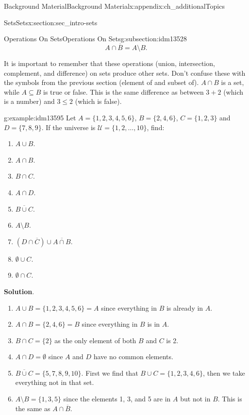 \documentclass[oneside,10pt,]{book}
\numberwithin{equation}{chapter}
\def\U{\mathcal U}
\begin{document}
\begin{appendixptx}{Background Material}{}{Background Material}{}{}{x:appendix:ch_additionalTopics}
\begin{sectionptx}{Sets}{}{Sets}{}{}{x:section:sec_intro-sets}
\begin{subsectionptx}{Operations On Sets}{}{Operations On Sets}{}{}{g:subsection:idm13528}
\begin{equation*}
A \cap \overline B = A \setminus B.
\end{equation*}
%
\par
It is important to remember that these operations (union, intersection, complement, and difference) on sets produce other sets. Don't confuse these with the symbols from the previous section (element of and subset of). \(A \cap B\) is a set, while \(A \subseteq B\) is true or false. This is the same difference as between \(3 + 2\) (which is a number) and \(3 \le 2\) (which is false).%
\begin{example}{}{g:example:idm13595}%
Let \(A = \{1, 2, 3, 4, 5, 6\}\), \(B = \{2, 4, 6\}\), \(C = \{1, 2, 3\}\) and \(D = \{7, 8, 9\}\). If the universe is \(\U = \{1, 2, \ldots, 10\}\), find:%
\begin{enumerate}
\item{}\(A \cup B\).%
\item{}\(A \cap B\).%
\item{}\(B \cap C\).%
\item{}\(A \cap D\).%
\item{}\(\overline{B \cup C}\).%
\item{}\(A \setminus B\).%
\item{}\((D \cap \overline C) \cup \overline{A \cap B}\).%
\item{}\(\emptyset \cup C\).%
\item{}\(\emptyset \cap C\).%
\end{enumerate}
%
\par\smallskip%
\noindent\textbf{Solution}.\hypertarget{g:solution:idm13622}{}\quad{}%
\begin{enumerate}
\item{}\(A \cup B = \{1, 2, 3, 4, 5, 6\} = A\) since everything in \(B\) is already in \(A\).%
\item{}\(A \cap B = \{2, 4, 6\} = B\) since everything in \(B\) is in \(A\).%
\item{}\(B \cap C = \{2\}\) as the only element of both \(B\) and \(C\) is 2.%
\item{}\(A \cap D = \emptyset\) since \(A\) and \(D\) have no common elements.%
\item{}\(\overline{B \cup C} = \{5, 7, 8, 9, 10\}\). First we find that \(B \cup C = \{1, 2, 3, 4, 6\}\), then we take everything not in that set.%
\item{}\(A \setminus B = \{1, 3, 5\}\) since the elements 1, 3, and 5 are in \(A\) but not in \(B\). This is the same as \(A \cap \overline B\).%

\end{enumerate}
\end{example}
\end{subsectionptx}
\end{sectionptx}
\end{appendixptx}
\end{document}
